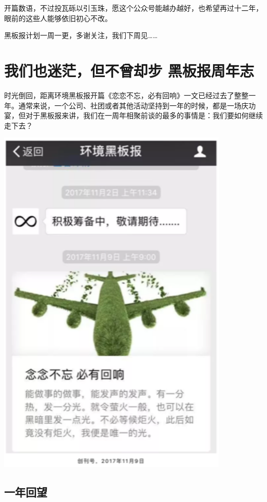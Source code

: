 \documentclass[]{book}
\begin{document}
开篇数语，不过投瓦砾以引玉珠，愿这个公众号能越办越好，也希望再过十二年，眼前的这些人能够依旧初心不改。

黑板报计划一周一更，多谢关注，我们下周见\ldots{}\ldots{}

\hypertarget{ux6211ux4eecux4e5fux8ff7ux832bux4f46ux4e0dux66feux5374ux6b65-ux9ed1ux677fux62a5ux5468ux5e74ux5fd7}{%
\section{我们也迷茫，但不曾却步 \textbar{} 黑板报周年志}\label{ux6211ux4eecux4e5fux8ff7ux832bux4f46ux4e0dux66feux5374ux6b65-ux9ed1ux677fux62a5ux5468ux5e74ux5fd7}}

时光倒回，距离环境黑板报开篇《恋恋不忘，必有回响》一文已经过去了整整一年。通常来说，一个公司、社团或者其他活动坚持到一年的时候，都是一场庆功宴，但对于黑板报来讲，我们在一周年相聚前谈的最多的事情是：我们要如何继续走下去？

\includegraphics[width=4.35in]{images/oneyear1}

\hypertarget{ux4e00ux5e74ux56deux671b}{%
\subsection{一年回望}\label{ux4e00ux5e74ux56deux671b}}
\end{document}

